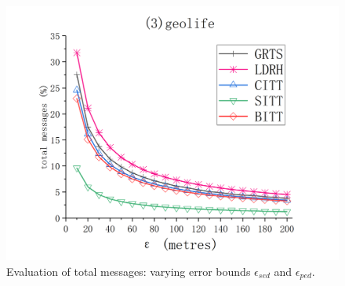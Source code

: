 {\begin{figure}[tb!]
	\includegraphics[scale = 0.560]{figures/Fig-geolife-total-messages.png}\hspace{1ex}
	\vspace{-1ex}
	\caption{\small Evaluation of total messages: varying error bounds $\epsilon_{sed}$ and $\epsilon_{ped}$.}
	\label{fig:total-message}
	\vspace{-1ex}
\end{figure}

}

